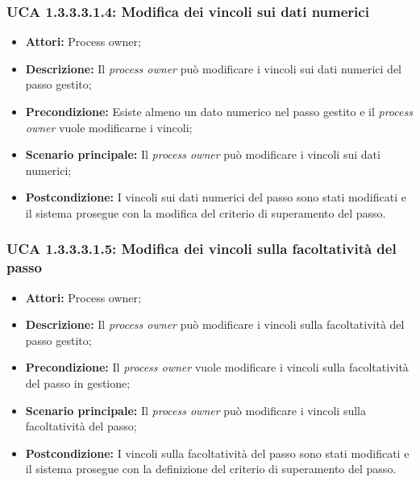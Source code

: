 \hypertarget{A1.3.3.3.1.4}{}
\subsubsection{UCA 1.3.3.3.1.4: Modifica dei vincoli sui dati numerici}
\begin{itemize}
\item \textbf{Attori:} Process owner;
\item \textbf{Descrizione:}
Il \textit{process owner} può modificare i vincoli sui dati numerici del passo gestito;
\item \textbf{Precondizione:}
Esiste almeno un dato numerico nel passo gestito e il \textit{process owner} vuole modificarne i vincoli;
\item \textbf{Scenario principale:}
Il \textit{process owner} può modificare i vincoli sui dati numerici;
\item \textbf{Postcondizione:}
I vincoli sui dati numerici del passo sono stati modificati e il sistema prosegue con la modifica del criterio di superamento del passo.
\end{itemize}

\hypertarget{A1.3.3.3.1.5}{}
\subsubsection{UCA 1.3.3.3.1.5: Modifica dei vincoli sulla facoltatività del passo}
\begin{itemize}
\item \textbf{Attori:} Process owner;
\item \textbf{Descrizione:}
Il \textit{process owner} può modificare i vincoli sulla facoltatività del passo gestito;
\item \textbf{Precondizione:}
Il \textit{process owner} vuole modificare i vincoli sulla facoltatività del passo in gestione;
\item \textbf{Scenario principale:}
Il \textit{process owner} può modificare i vincoli sulla facoltatività del passo;
\item \textbf{Postcondizione:}
I vincoli sulla facoltatività del passo sono stati modificati e il sistema prosegue con la definizione del criterio di superamento del passo.
\end{itemize}

